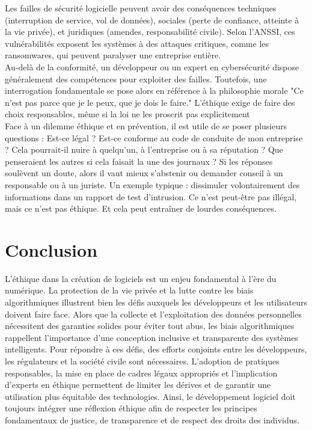 \documentclass{article}
\begin{document}
Les failles de sécurité logicielle peuvent avoir des conséquences techniques (interruption
de service, vol de données), sociales (perte de confiance, atteinte à la vie privée), et juridiques
(amendes, responsabilité civile). Selon l’ANSSI, ces vulnérabilités exposent les systèmes à des
attaques critiques, comme les ransomwares, qui peuvent paralyser une entreprise entière.\\

Au-delà de la conformité, un développeur ou un expert en cybersécurité dispose
généralement des compétences pour exploiter des failles. Toutefois, une interrogation
fondamentale se pose alors en référence à la philosophie morale
"Ce n’est pas parce que je le
peux, que je dois le faire." L’éthique exige de faire des choix responsables, même si la loi ne les
proscrit pas explicitement\\

Face à un dilemme éthique et en prévention, il est utile de se poser plusieurs questions : Est-ce
légal ? Est-ce conforme au code de conduite de mon entreprise ? Cela pourrait-il nuire à
quelqu’un, à l’entreprise ou à sa réputation ? Que penseraient les autres si cela faisait la une
des journaux ?
Si les réponses soulèvent un doute, alors il vaut mieux s’abstenir ou demander conseil à un
responsable ou à un juriste. Un exemple typique : dissimuler volontairement des informations
dans un rapport de test d’intrusion. Ce n’est peut-être pas illégal, mais ce n’est pas éthique. Et
cela peut entraîner de lourdes conséquences.\\


\section{Conclusion}
L’éthique dans la création de logiciels est un enjeu fondamental à l’ère du numérique. La protection de la vie privée et la lutte contre les biais algorithmiques illustrent bien les défis auxquels les développeurs et les utilisateurs doivent faire face. Alors que la collecte et l’exploitation des données personnelles nécessitent des garanties solides pour éviter tout abus, les biais algorithmiques rappellent l’importance d’une conception inclusive et transparente des systèmes intelligents.
Pour répondre à ces défis, des efforts conjoints entre les développeurs, les régulateurs et la société civile sont nécessaires. L’adoption de pratiques responsables, la mise en place de cadres légaux appropriés et l’implication d’experts en éthique permettent de limiter les dérives et de garantir une utilisation plus équitable des technologies. Ainsi, le développement logiciel doit toujours intégrer une réflexion éthique afin de respecter les principes fondamentaux de justice, de transparence et de respect des droits des individus.
\end{document}
